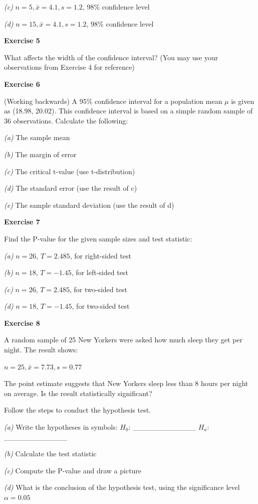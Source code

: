 \documentclass[
]{book}
\begin{document}
\emph{(c)} \(n=5, \bar{x}=4.1, s=1.2\), 98\% confidence level

\emph{(d)} \(n=15, \bar{x}=4.1, s=1.2\), 98\% confidence level

\textbf{Exercise 5}

What affects the width of the confidence interval? (You may use your observations from Exercise 4 for reference)

\textbf{Exercise 6}

(Working backwards) A 95\% confidence interval for a population mean \(\mu\) is given as (18.98, 20.02). This confidence interval is based on a simple random sample of 36 observations. Calculate the following:

\emph{(a)} The sample mean

\emph{(b)} The margin of error

\emph{(c)} The critical t-value (use t-distribution)

\emph{(d)} The standard error (use the result of c)

\emph{(e)} The sample standard deviation (use the result of d)

\textbf{Exercise 7}

Find the P-value for the given sample sizes and test statistic:

\emph{(a)} \(n=26\), \(T=2.485\), for right-sided test

\emph{(b)} \(n=18\), \(T=-1.45\), for left-sided test

\emph{(c)} \(n=26\), \(T=2.485\), for two-sided test

\emph{(d)} \(n=18\), \(T=-1.45\), for two-sided test

\textbf{Exercise 8}

A random sample of 25 New Yorkers were asked how much sleep they get per night. The result shows:

\(n=25, \bar{x}=7.73, s=0.77\)

The point estimate suggests that New Yorkers sleep less than 8 hours per night on average. Is the result statistically significant?

Follow the steps to conduct the hypothesis test.

\emph{(a)} Write the hypotheses in symbols: \(H_0\): \_\_\_\_\_\_\_\_\_\_\_\_ \(H_a\): \_\_\_\_\_\_\_\_\_\_\_\_

\emph{(b)} Calculate the test statistic

\emph{(c)} Compute the P-value and draw a picture

\emph{(d)} What is the conclusion of the hypothesis test, using the significance level \(\alpha=0.05\)
\end{document}
